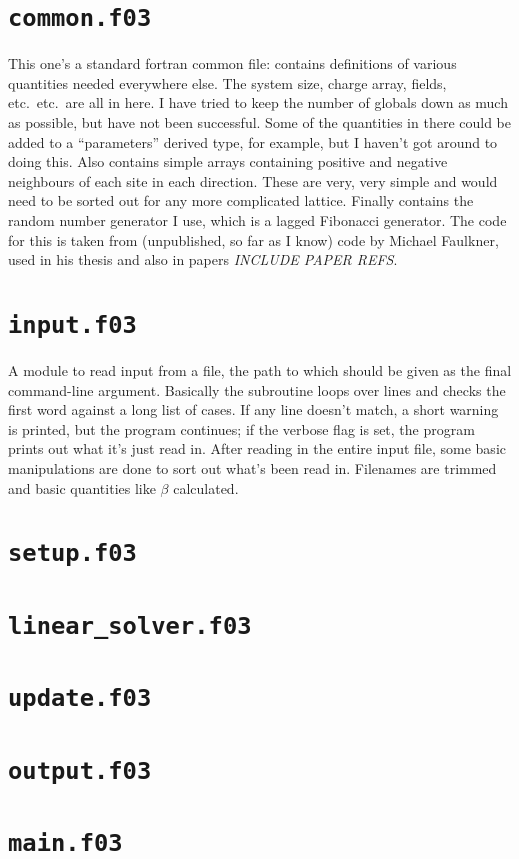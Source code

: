 \documentclass{article}
\begin{document}
\section*{\texttt{common.f03}}

This one's a standard fortran common file: contains definitions of various quantities needed everywhere else.
The system size, charge array, fields, etc.\ etc.\ are all in here.
I have tried to keep the number of globals down as much as possible, but have not been successful.
Some of the quantities in there could be added to a ``parameters'' derived type, for example, but I haven't got around to doing this.
Also contains simple arrays containing positive and negative neighbours of each site in each direction.
These are very, very simple and would need to be sorted out for any more complicated lattice.
Finally contains the random number generator I use, which is a lagged Fibonacci generator.
The code for this is taken from (unpublished, so far as I know) code by Michael Faulkner, used in his thesis and also in papers \emph{INCLUDE PAPER REFS}.

\section*{\texttt{input.f03}}

A module to read input from a file, the path to which should be given as the final command-line argument.
Basically the subroutine loops over lines and checks the first word against a long list of cases.
If any line doesn't match, a short warning is printed, but the program continues; if the verbose flag is set, the program prints out what it's just read in.
After reading in the entire input file, some basic manipulations are done to sort out what's been read in.
Filenames are trimmed and basic quantities like $\beta$ calculated.

\section*{\texttt{setup.f03}}

\section*{\texttt{linear{\_}solver.f03}}

\section*{\texttt{update.f03}}

\section*{\texttt{output.f03}}

\section*{\texttt{main.f03}}
\end{document}
